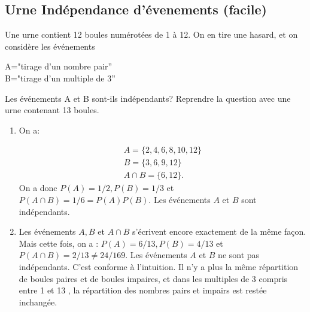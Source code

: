 \subsection{Urne Indépendance d'évenements (facile)}

\begin{exercice}
 Une urne contient 12 boules numérotées de 1 à 12. On en tire une hasard, et on considère les événements
\begin{center}
A="tirage d'un nombre pair''\\
B="tirage d'un multiple de 3''
\end{center}
Les événements A et B sont-ils indépendants?
 Reprendre la question avec une urne contenant 13 boules.
\end{exercice}



\begin{correction}
\begin{enumerate}
  \item On a:

$$
\begin{gathered}
A=\{2,4,6,8,10,12\} \\
B=\{3,6,9,12\} \\
A \cap B=\{6,12\} .
\end{gathered}
$$
On a donc $P(A)=1 / 2, P(B)=1 / 3$ et $P(A \cap B)=1 / 6=P(A) P(B) .$ Les événements $A$ et $B$ sont indépendants.\\
\item  Les événements $A, B$ et $A \cap B$ s'écrivent encore exactement de la même façon. Mais cette fois, on a : $P(A)=6 / 13, P(B)=4 / 13$ et $P(A \cap B)=2 / 13 \neq 24 / 169$. Les événements $A$ et $B$ ne sont pas indépendants. C'est conforme à l'intuition. Il n'y a plus la même répartition de boules paires et de boules impaires, et dans les multiples de 3 compris entre 1 et 13 , la répartition des nombres pairs et impairs est restée inchangée.
\end{enumerate}
\end{correction}